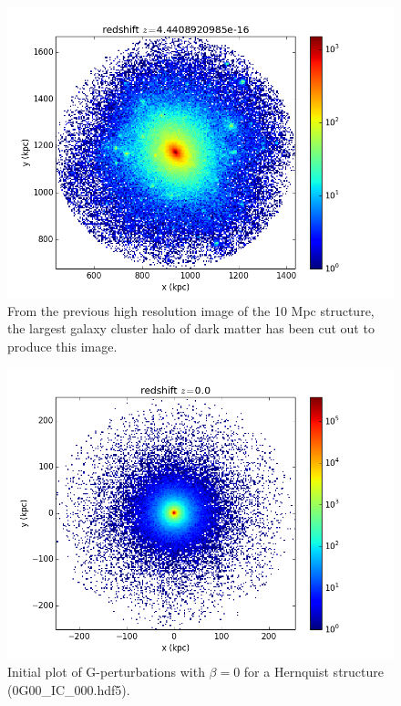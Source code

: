 \begin{figure}
\centering
\includegraphics[width=1.0\linewidth]{img/Read_ics_2.png}
\caption{From the previous high resolution image of the 10 Mpc structure, 
the largest galaxy cluster halo of dark matter has been cut out to produce this image.}
\label{fig:test}
\end{figure}

\begin{figure}
\centering
\includegraphics[width=1.0\linewidth]{img/Read_OG_IC_2.png}
\caption{Initial plot of G-perturbations with $ \beta = 0$ for a Hernquist structure (0G00\_IC\_000.hdf5).}
\label{fig:test}
\end{figure}

